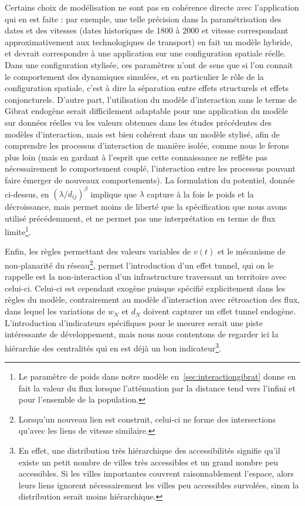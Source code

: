 Certains choix de modélisation ne sont pas en cohérence directe avec l'application qui en est faite : par exemple, une telle précision dans la paramétrisation des dates et des vitesses (dates historiques de 1800 à 2000 et vitesse correspondant approximativement aux technologiques de transport) en fait un modèle hybride, et devrait correspondre à une application sur une configuration spatiale réelle. Dans une configuration stylisée, ces paramètres n'ont de sens que si l'on connait le comportement des dynamiques simulées, et en particulier le rôle de la configuration spatiale, c'est à dire la séparation entre effets structurels et effets conjoncturels. D'autre part, l'utilisation du modèle d'interaction sans le terme de Gibrat endogène serait difficilement adaptable pour une application du modèle sur données réelles vu les valeurs obtenues dans les études précédentes des modèles d'interaction, mais est bien cohérent dans un modèle stylisé, afin de comprendre les processus d'interaction de manière isolée, comme nous le ferons plus loin (mais en gardant à l'esprit que cette connaissance ne reflète pas nécessairement le comportement couplé, l'interaction entre les processus pouvant faire émerger de nouveaux comportements). La formulation du potentiel, donnée ci-dessus, en $(\lambda / d_{ij})^\beta$ implique que $\lambda$ capture à la fois le poids et la décroissance, mais permet moins de liberté que la spécification que nous avons utilisé précédemment, et ne permet pas une interprétation en terme de flux limite\footnote{Le paramètre de poids dans notre modèle en~\ref{sec:interactiongibrat} donne en fait la valeur du flux lorsque l'atténuation par la distance tend vers l'infini et pour l'ensemble de la population.}.

Enfin, les règles permettant des valeurs variables de $v(t)$ et le mécanisme de non-planarité du réseau\footnote{Lorsqu'un nouveau lien est construit, celui-ci ne forme des intersections qu'avec les liens de vitesse similaire.}, permet l'introduction d'un effet tunnel, qui on le rappelle est la non-interaction d'un infrastructure traversant un territoire avec celui-ci. Celui-ci est cependant exogène puisque spécifié explicitement dans les règles du modèle, contrairement au modèle d'interaction avec rétroaction des flux, dans lequel les variations de $w_N$ et $d_N$ doivent capturer un effet tunnel endogène. L'introduction d'indicateurs spécifiques pour le mesurer serait une piste intéressante de développement, mais nous nous contentons de regarder ici la hiérarchie des centralités qui en est déjà un bon indicateur\footnote{En effet, une distribution très hiérarchique des accessibilités signifie qu'il existe un petit nombre de villes très accessibles et un grand nombre peu accessibles. Si les villes importantes couvrent raisonnablement l'espace, alors leurs liens ignorent nécessairement les villes peu accessibles survolées, sinon la distribution serait moins hiérarchique.}.



